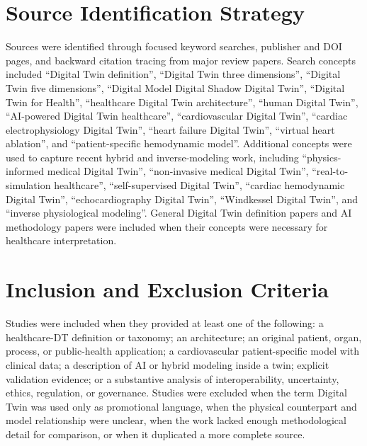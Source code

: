 \section{Source Identification Strategy}
Sources were identified through focused keyword searches, publisher and DOI pages, and backward citation tracing from major review papers. Search concepts included ``Digital Twin definition'', ``Digital Twin three dimensions'', ``Digital Twin five dimensions'', ``Digital Model Digital Shadow Digital Twin'', ``Digital Twin for Health'', ``healthcare Digital Twin architecture'', ``human Digital Twin'', ``AI-powered Digital Twin healthcare'', ``cardiovascular Digital Twin'', ``cardiac electrophysiology Digital Twin'', ``heart failure Digital Twin'', ``virtual heart ablation'', and ``patient-specific hemodynamic model''. Additional concepts were used to capture recent hybrid and inverse-modeling work, including ``physics-informed medical Digital Twin'', ``non-invasive medical Digital Twin'', ``real-to-simulation healthcare'', ``self-supervised Digital Twin'', ``cardiac hemodynamic Digital Twin'', ``echocardiography Digital Twin'', ``Windkessel Digital Twin'', and ``inverse physiological modeling''. General Digital Twin definition papers and AI methodology papers were included when their concepts were necessary for healthcare interpretation.

\section{Inclusion and Exclusion Criteria}
Studies were included when they provided at least one of the following: a healthcare-DT definition or taxonomy; an architecture; an original patient, organ, process, or public-health application; a cardiovascular patient-specific model with clinical data; a description of AI or hybrid modeling inside a twin; explicit validation evidence; or a substantive analysis of interoperability, uncertainty, ethics, regulation, or governance. Studies were excluded when the term Digital Twin was used only as promotional language, when the physical counterpart and model relationship were unclear, when the work lacked enough methodological detail for comparison, or when it duplicated a more complete source.

